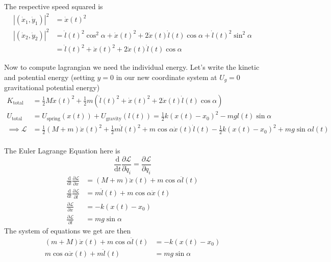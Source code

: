 \documentclass[letter, 10pts]{article}
\begin{document}
The respective speed squared is
\begin{align*} 
	|(\dot x_1,  \dot y_1)|^2 &= \dot x(t) ^2 \\ 
|	(\dot x_2, \dot y_2) |^2&= 
\dot l(t) ^2  \cos ^2 \alpha + \dot x(t) ^2 + 2 \dot x(t) \dot l(t) \cos \alpha  + \dot l(t) ^2 \sin ^2 \alpha  \\ 
&=  
\dot l(t) ^2   + \dot x(t) ^2 + 2 \dot x(t) \dot l(t) \cos \alpha   
\end{align*}

Now to compute lagrangian we need the individual energy. Let's write the kinetic and potential energy (setting $y = 0$ in our new coordinate system at $U_g = 0$ gravitational potential energy)
\begin{align*}
	K_\text{total} &= \frac{1}{2}M \dot x(t)^2 + 
	\frac{1}{2} m \left(\dot l (t) ^2 + \dot x (t) ^2  + 2 \dot x(t) \dot l(t) \cos \alpha \right)\\
U_\text{total} &=  	
	U_\text{spring} (x(t)) + 
	U_\text{gravity} (l(t)) = \frac{1}{2} k (x(t) - x_0)^2 
	- m g l(t) \sin \alpha\\ 
	\implies \mathcal L &= 
\frac{1}{2} (M + m ) \dot x (t) ^2 + 
\frac{1}{2} m \dot l (t) ^2 + 
m \cos \alpha \dot x(t) \dot l(t)  
- \frac{1}{2} k (x(t) - x_0)^2 + mg \sin \alpha 	 l(t)
	\\
\end{align*}

The Euler Lagrange Equation here is 
\[
	\frac{\mathrm{d} }{\mathrm{d} t} 
	\frac{\partial \mathcal L}{\partial \dot q_i} = 
	\frac{\partial \mathcal L }{ \partial q_i }
\] 
\begin{align*}
	\frac{\mathrm{d} }{\mathrm{d} t 
	}
	\frac{\partial \mathcal L}{\partial \dot x} 
	&= 
	(M+m) \ddot{x}(t) + 
	m \cos \alpha \ddot{l}(t) 
	\\
	\frac{\mathrm{d} }{\mathrm{d} t 
	}
	\frac{\partial \mathcal L}{\partial \dot l} 
	&= 
	m \ddot{l}(t) + m \cos \alpha \ddot{x}(t) 
	\\
	\frac{\partial \mathcal L}{\partial x} &= 
        -k (x(t) - x_0) 
	\\
	\frac{\partial \mathcal L}{\partial l} &= 
	mg \sin \alpha 
\end{align*}
The system of equations we get are then 
\begin{align*}
	(m + M) \ddot{x} (t) + m \cos \alpha \ddot{l}(t) &= - k (x(t) - x_0) \\
	m \cos \alpha \ddot{x}(t) + m \ddot{l}(t) &= mg \sin \alpha  \\
\end{align*}
\end{document}
